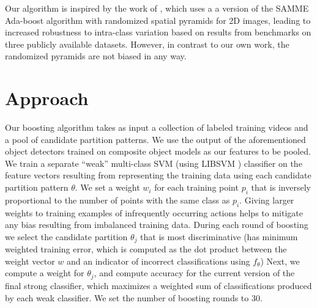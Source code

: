 \documentclass{bmvc2k}
\begin{document}
	Our algorithm is inspired by the work of \cite{Jiang12}, which uses a
  a version of the SAMME Ada-boost algorithm \cite{Zhu06}
  with randomized spatial pyramids for 2D images, 
	leading to increased robustness to intra-class variation based on results
  from benchmarks on three publicly available datasets. However, in contrast
  to our own work, the randomized pyramids are not biased in any way. 
	

\section{Approach}

	Our boosting algorithm takes as input a collection of labeled training videos
	and a pool of candidate partition patterns. We use the output of the
  aforementioned object detectors trained on composite object models as our features to be
  pooled.
  We train a separate ``weak''
  multi-class SVM 
  (using LIBSVM \cite{Chang11})
	classifier on the feature vectors resulting from representing the training
	data using each candidate partition pattern $\theta$. We set a weight
  $w_i$ for each
	training point $p_i$ that is inversely proportional to the number of points
	with the same class as $p_i$. Giving larger weights to training examples of
  infrequently occurring actions helps to mitigate any bias resulting from imbalanced
  training data.
  During each round of boosting we select the
	candidate partition $\theta_j$ that is most discriminative (has minimum
  weighted training
	error, which is computed as the dot product between the weight vector $w$
  and an indicator of incorrect classifications using $f_\theta$)
  Next, we compute a weight for $\theta_j$, and compute accuracy for the
	current version of the final strong classifier, which maximizes a weighted
  sum of classifications produced by each weak classifier.
	We set the number of boosting rounds to 30.\\
\end{document}
